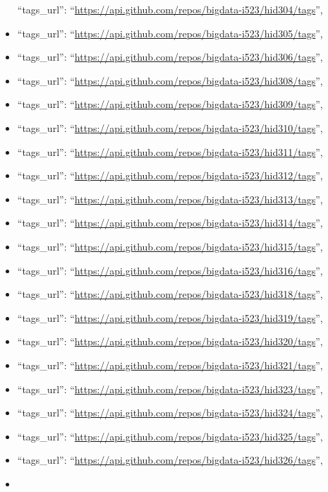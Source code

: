 \begin{itemize}
  ``tags\_url'':
  ``\url{https://api.github.com/repos/bigdata-i523/hid304/tags}'',
\item
  ``tags\_url'':
  ``\url{https://api.github.com/repos/bigdata-i523/hid305/tags}'',
\item
  ``tags\_url'':
  ``\url{https://api.github.com/repos/bigdata-i523/hid306/tags}'',
\item
  ``tags\_url'':
  ``\url{https://api.github.com/repos/bigdata-i523/hid308/tags}'',
\item
  ``tags\_url'':
  ``\url{https://api.github.com/repos/bigdata-i523/hid309/tags}'',
\item
  ``tags\_url'':
  ``\url{https://api.github.com/repos/bigdata-i523/hid310/tags}'',
\item
  ``tags\_url'':
  ``\url{https://api.github.com/repos/bigdata-i523/hid311/tags}'',
\item
  ``tags\_url'':
  ``\url{https://api.github.com/repos/bigdata-i523/hid312/tags}'',
\item
  ``tags\_url'':
  ``\url{https://api.github.com/repos/bigdata-i523/hid313/tags}'',
\item
  ``tags\_url'':
  ``\url{https://api.github.com/repos/bigdata-i523/hid314/tags}'',
\item
  ``tags\_url'':
  ``\url{https://api.github.com/repos/bigdata-i523/hid315/tags}'',
\item
  ``tags\_url'':
  ``\url{https://api.github.com/repos/bigdata-i523/hid316/tags}'',
\item
  ``tags\_url'':
  ``\url{https://api.github.com/repos/bigdata-i523/hid318/tags}'',
\item
  ``tags\_url'':
  ``\url{https://api.github.com/repos/bigdata-i523/hid319/tags}'',
\item
  ``tags\_url'':
  ``\url{https://api.github.com/repos/bigdata-i523/hid320/tags}'',
\item
  ``tags\_url'':
  ``\url{https://api.github.com/repos/bigdata-i523/hid321/tags}'',
\item
  ``tags\_url'':
  ``\url{https://api.github.com/repos/bigdata-i523/hid323/tags}'',
\item
  ``tags\_url'':
  ``\url{https://api.github.com/repos/bigdata-i523/hid324/tags}'',
\item
  ``tags\_url'':
  ``\url{https://api.github.com/repos/bigdata-i523/hid325/tags}'',
\item
  ``tags\_url'':
  ``\url{https://api.github.com/repos/bigdata-i523/hid326/tags}'',
\item

\end{itemize}
